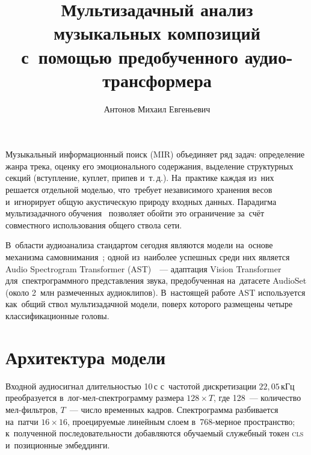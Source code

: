 \documentclass{stud-conf-pmk}
\begin{document}

\begin{paper}
\author[Антонов М.\,Е.]{Антонов Михаил Евгеньевич}
\title{Мультизадачный анализ музыкальных композиций с~помощью предобученного аудио-трансформера}
\maketitle

\introduction

Музыкальный информационный поиск (MIR) объединяет ряд задач: определение жанра трека, оценку его эмоционального содержания, выделение структурных секций (вступление, куплет, припев и~т.\,д.). На~практике каждая из~них решается отдельной моделью, что~требует независимого хранения весов и~игнорирует общую акустическую природу входных данных. Парадигма мультизадачного обучения~\cite{bib_ruder_mtl} позволяет обойти это ограничение за~счёт совместного использования общего ствола сети.

В~области аудиоанализа стандартом сегодня являются модели на~основе механизма самовнимания~\cite{bib_vaswani_transformer}; одной из~наиболее успешных среди них является Audio Spectrogram Transformer (AST)~\cite{bib_gong_ast}~--- адаптация Vision Transformer для~спектрограммного представления звука, предобученная на~датасете AudioSet (около 2~млн размеченных аудиоклипов). В~настоящей работе AST используется как~общий ствол мультизадачной модели, поверх которого размещены четыре классификационные головы.


\section{Архитектура модели}

Входной аудиосигнал длительностью 10\,с с~частотой дискретизации $22{,}05$\,кГц преобразуется в~лог-мел-спектрограмму размера $128 \times T$, где 128~--- количество мел-фильтров, $T$~--- число временных кадров. Спектрограмма разбивается на~патчи $16 \times 16$, проецируемые линейным слоем в~768-мерное пространство; к~полученной последовательности добавляются обучаемый служебный токен \textsc{cls} и~позиционные эмбеддинги.


\end{paper}
\end{document}
